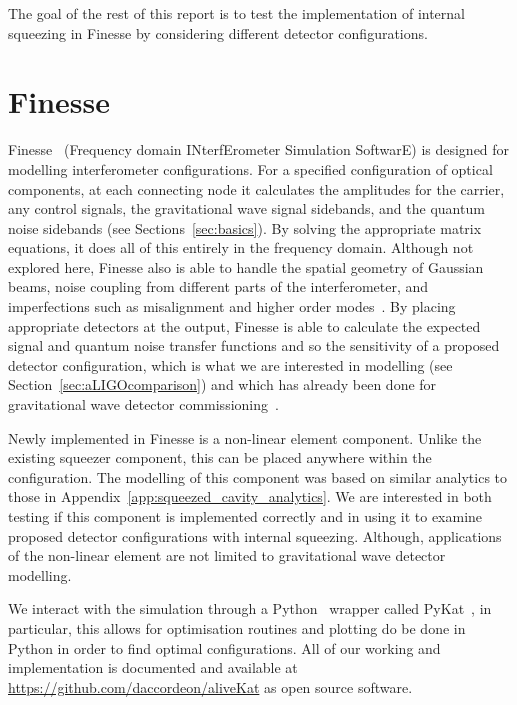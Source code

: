 \documentclass[aps,pra,superscriptaddress,reprint,nofootinbib]{revtex4-1}
\begin{document}
The goal of the rest of this report is to test the implementation of internal squeezing in Finesse by considering different detector configurations.


\section{Finesse} %
\label{sec:Finesse}

Finesse~\cite{finesse} (Frequency domain INterfErometer Simulation SoftwarE) is designed for modelling interferometer configurations. For a specified configuration of optical components, at each connecting node it calculates the amplitudes for the carrier, any control signals, the gravitational wave signal sidebands, and the quantum noise sidebands (see Sections~\ref{sec:basics}). By solving the appropriate matrix equations, it does all of this entirely in the frequency domain.
Although not explored here, Finesse also is able to handle the spatial geometry of Gaussian beams, noise coupling from different parts of the interferometer, and imperfections such as misalignment and higher order modes~\cite{Bond_et_al_2016}.
By placing appropriate detectors at the output, Finesse is able to calculate the expected signal and quantum noise transfer functions and so the sensitivity of a proposed detector configuration, which is what we are interested in modelling (see Section~\ref{sec:aLIGOcomparison}) and which has already been done for gravitational wave detector commissioning~\cite{brown2020pykat}.


Newly implemented in Finesse is a non-linear element component. Unlike the existing squeezer component, this can be placed anywhere within the configuration. The modelling of this component was based on similar analytics to those in Appendix~\ref{app:squeezed_cavity_analytics}. We are interested in both testing if this component is implemented correctly and in using it to examine proposed detector configurations with internal squeezing. Although, applications of the non-linear element are not limited to gravitational wave detector modelling.


We interact with the simulation through a Python~\cite{python} wrapper called PyKat~\cite{brown2020pykat}, in particular, this allows for optimisation routines and plotting do be done in Python in order to find optimal configurations. All of our working and implementation is documented and available at \url{https://github.com/daccordeon/aliveKat} as open source software.
\end{document}
